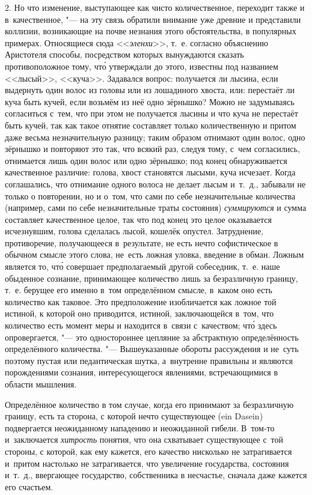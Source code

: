 2. Но что изменение, выступающее как чисто количественное, переходит также и
в~качественное, "--- на эту связь обратили внимание уже древние и представили
коллизии, возникающие на почве незнания этого обстоятельства, в популярных
примерах. Относящиеся сюда <<{\em эленхи}>>, т.~е. согласно объяснению
Аристотеля способы, посредством которых вынуждаются сказать противоположное
тому, чт\'{о} утверждали до этого, известны под названием <<лысый>>, <<куча>>.
Задавался вопрос: получается ли лысина, если выдернуть один волос из головы или
из лошадиного хвоста, или: перестаёт ли куча быть кучей, если возьмём из неё
одно зёрнышко? Можно не задумываясь согласиться с~тем, что при этом не
получается лысины и что куча не перестаёт быть кучей, так как такое отнятие
составляет только количественную и притом даже весьма незначительную разницу;
таким образом отнимают один волос, одно зёрнышко и повторяют это так, что
всякий раз, следуя тому, с~чем согласились, отнимается лишь один волос или одно
зёрнышко; под конец обнаруживается качественное различие: голова, хвост
становятся лысыми, куча исчезает. Когда соглашались, что отнимание одного
волоса не делает лысым и~т.~д., забывали не только о повторении, но и о~том,
что сами по себе незначительные количества (например, сами по себе
незначительные траты состояния) {\em суммируются} и сумма составляет
качественное целое, так что под конец это целое оказывается исчезнувшим, голова
сделалась лысой, кошелёк опустел. Затруднение, противоречие, получающееся
в~результате, не есть нечто софистическое в обычном смысле этого слова, не~есть
ложная уловка, введение в обман. Ложным является то, чт\'{о} совершает
предполагаемый другой собеседник, т.~е. наше обыденное сознание, принимающее
количество лишь за безразличную границу, т.~е. берущее его именно в~том
определённом смысле, в~каком оно есть количество как таковое. Это предположение
изобличается как ложное той истиной, к которой оно приводится, истиной,
заключающейся в~том, что количество есть момент меры и находится в~связи
с~качеством; чт\'{о} здесь опровергается, "--- это одностороннее цепляние за
абстрактную определённость определённого количества. "--- Вышеуказанные
обороты рассуждения и не~суть поэтому пустая или педантическая шутка,
а~внутренне правильны и являются порождениями сознания, интересующегося
явлениями, встречающимися в области мышления.

Определённое количество в том случае, когда его принимают за безразличную
границу, есть та сторона, с которой нечто существующее (ein Dasein)
подвергается неожиданному нападению и неожиданной гибели. В~том-то
и~заключается {\em хитрость} понятия, что она схватывает существующее с~той
стороны, с которой, как ему кажется, его качество нисколько не затрагивается
и~притом настолько не затрагивается, что увеличение государства, состояния
и~т.~д., ввергающее государство, собственника в несчастье, сначала даже кажется
его счастьем.

